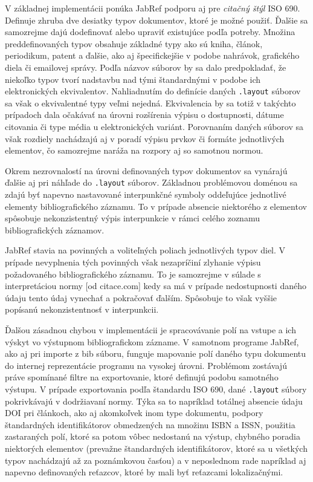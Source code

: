 \documentclass{fithesis3}
\begin{document}
	V základnej implementácii ponúka JabRef podporu aj pre \textit{citačný štýl} ISO 690. Definuje zhruba dve desiatky typov dokumentov, ktoré je možné použiť. Ďalšie sa samozrejme dajú dodefinovať alebo upraviť existujúce podľa potreby. Množina preddefinovaných typov obsahuje základné typy ako sú kniha, článok, periodikum, patent a ďalšie, ako aj špecifickejšie v podobe nahrávok, grafického diela či emailovej správy. Podľa názvov súborov by sa dalo predpokladať, že niekoľko typov tvorí nadstavbu nad tými štandardnými v podobe ich elektronických ekvivalentov. Nahliadnutím do definície daných \texttt{.layout} súborov sa však o ekvivalentné typy veľmi nejedná. Ekvivalencia by sa totiž v takýchto prípadoch dala očakávať na úrovni rozšírenia výpisu o dostupnosti, dátume citovania či type média u elektronických variánt. Porovnaním daných súborov sa však rozdiely nachádzajú aj v poradí výpisu prvkov či formáte jednotlivých elementov, čo samozrejme naráža na rozpory aj so samotnou normou.
	
	Okrem nezrovnalostí na úrovni definovaných typov dokumentov sa vynárajú ďalšie aj pri náhľade do \texttt{.layout} súborov. Základnou problémovou doménou sa zdajú byť napevno nastavované interpunkčné symboly oddeľujúce jednotlivé elementy bibliografického záznamu. To v prípade absencie niektorého z elementov spôsobuje nekonzistentný výpis interpunkcie v rámci celého zoznamu bibliografických záznamov.
	
	JabRef stavia na povinných a voliteľných poliach jednotlivých typov diel. V prípade nevyplnenia tých povinných však nezapríčiní zlyhanie výpisu požadovaného bibliografického záznamu. To je samozrejme v súlade s interpretáciou normy [od citace.com] kedy sa má v prípade nedostupnosti daného údaju tento údaj vynechať a pokračovať ďalším. Spôsobuje to však vyššie popísanú nekonzistentnosť v interpunkcii.
	
	Ďalšou zásadnou chybou v implementácii je spracovávanie polí na vstupe a ich výskyt vo výstupnom bibliografickom zázname. V samotnom programe JabRef, ako aj pri importe z bib súboru, funguje mapovanie polí daného typu dokumentu do internej reprezentácie programu na vysokej úrovni. Problémom zostávajú práve spomínané filtre na exportovanie, ktoré definujú podobu samotného výstupu. V prípade exportovania podľa štandardu ISO 690, dané \texttt{.layout} súbory pokrivkávajú v dodržiavaní normy. Týka sa to napríklad totálnej absencie údaju DOI pri článkoch, ako aj akomkoľvek inom type dokumentu, podpory štandardných identifikátorov obmedzených na množinu ISBN a ISSN, použitia zastaraných polí, ktoré sa potom vôbec nedostanú na výstup, chybného poradia niektorých elementov (prevažne štandardných identifikátorov, ktoré sa u všetkých typov nachádzajú až za poznámkovou časťou) a v neposlednom rade napríklad aj napevno definovaných reťazcov, ktoré by mali byť reťazcami lokalizačnými.
	
\end{document}
